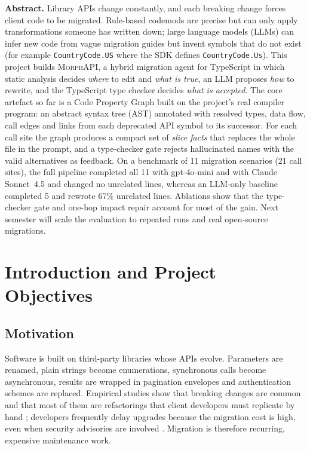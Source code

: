 \documentclass[11pt,a4paper]{article}
\newcommand{\code}[1]{\texttt{#1}}
\newcommand{\morph}{\textsc{MorphAPI}}
\begin{document}
\begin{titlepage}
\begin{minipage}{0.86\textwidth}
\small
\textbf{Abstract.}
Library APIs change constantly, and each breaking change forces client code to be
migrated. Rule-based codemods are precise but can only apply transformations someone
has written down; large language models (LLMs) can infer new code from vague migration
guides but invent symbols that do not exist (for example \code{CountryCode.US} where
the SDK defines \code{CountryCode.Us}). This project builds \morph{}, a hybrid
migration agent for TypeScript in which static analysis decides \emph{where} to edit and
\emph{what is true}, an LLM proposes \emph{how} to rewrite, and the TypeScript type checker
decides \emph{what is accepted}. The core artefact so far is a Code Property Graph built on
the project's real compiler program: an abstract syntax tree (AST) annotated with resolved
types, data flow, call edges and links from each deprecated API symbol to its successor.
For each call site the graph produces a compact set of \emph{slice facts} that replaces the
whole file in the prompt, and a type-checker gate rejects hallucinated names with the valid
alternatives as feedback. On a benchmark of 11 migration scenarios (21 call sites), the full
pipeline completed all 11 with gpt-4o-mini and with Claude Sonnet~4.5 and changed no
unrelated lines, whereas an LLM-only baseline completed 5 and rewrote 67\% unrelated lines.
Ablations show that the type-checker gate and one-hop impact repair account for most of
the gain. Next semester will scale the evaluation to repeated runs and real open-source
migrations.
\end{minipage}
\end{titlepage}

\tableofcontents
\newpage

\section{Introduction and Project Objectives}
\label{sec:intro}

\subsection{Motivation}

Software is built on third-party libraries whose APIs evolve. Parameters are renamed,
plain strings become enumerations, synchronous calls become asynchronous, results are
wrapped in pagination envelopes and authentication schemes are replaced. Empirical studies
show that breaking changes are common and that most of them are refactorings that client
developers must replicate by hand \citep{dig2006apis,xavier2017breaking}; developers
frequently delay upgrades because the migration cost is high, even when security advisories
are involved \citep{kula2018update,bogart2016break}. Migration is therefore recurring,
expensive maintenance work.
\end{document}
